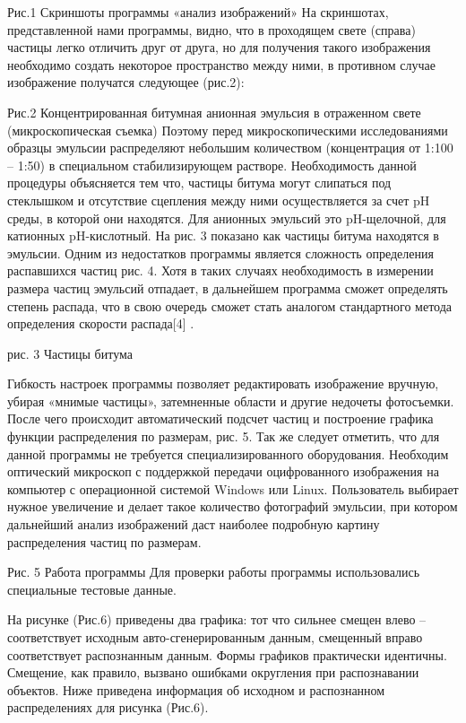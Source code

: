 Рис.1 Скриншоты программы «анализ изображений»
На скриншотах, представленной нами программы, видно, что в проходящем свете (справа) частицы легко отличить друг от друга, но для получения такого изображения необходимо создать некоторое пространство между ними, в противном случае изображение получатся следующее (рис.2):

Рис.2 Концентрированная битумная анионная эмульсия в отраженном свете (микроскопическая съемка)
Поэтому перед микроскопическими исследованиями образцы эмульсии распределяют небольшим количеством (концентрация от 1:100 – 1:50) в специальном стабилизирующем растворе. Необходимость данной процедуры объясняется тем что, частицы битума могут слипаться под стеклышком и отсутствие сцепления между ними осуществляется за счет pH среды, в которой они находятся. Для анионных эмульсий это pH-щелочной, для катионных pH-кислотный. На рис. 3 показано как частицы битума находятся в эмульсии. Одним из недостатков программы является сложность определения распавшихся частиц рис. 4. Хотя в таких случаях необходимость в измерении размера частиц эмульсий отпадает, в дальнейшем программа сможет определять степень распада, что в свою очередь сможет стать аналогом стандартного метода определения скорости распада[4] .

рис. 3 Частицы битума                    

Гибкость настроек программы позволяет редактировать изображение вручную, убирая «мнимые частицы», затемненные области и другие недочеты фотосъемки. После чего происходит автоматический подсчет частиц и построение графика функции распределения по размерам, рис. 5. Так же следует отметить, что для данной программы не требуется специализированного оборудования. Необходим оптический микроскоп с поддержкой передачи оцифрованного изображения на компьютер с операционной системой Windows или Linux. Пользователь выбирает нужное увеличение и делает такое количество фотографий эмульсии, при котором дальнейший анализ изображений даст наиболее подробную картину распределения частиц по размерам.

Рис. 5 Работа программы
Для проверки работы программы использовались специальные тестовые данные. 

На рисунке (Рис.6) приведены два графика: тот что сильнее смещен влево – соответствует исходным авто-сгенерированным данным, смещенный вправо соответствует распознанным данным. Формы графиков практически идентичны. Смещение, как правило, вызвано ошибками округления при распознавании объектов. Ниже приведена информация об исходном и распознанном распределениях для рисунка (Рис.6).

